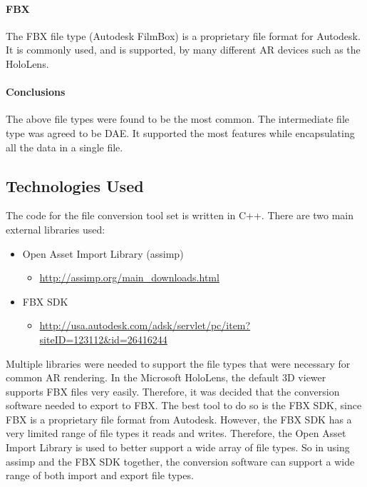     \paragraph{FBX}
    The FBX file type (Autodesk FilmBox) is a proprietary file format for Autodesk.  It is commonly used, and is supported, by many different AR devices such as the HoloLens.

    \paragraph{Conclusions}
    The above file types were found to be the most common.  The intermediate file type was agreed to be DAE.  It supported the most features while encapsulating all the data in a single file.

    \subsection{Technologies Used}
    
    The code for the file conversion tool set is written in C++.  There are two main external libraries used:
    \begin{itemize}
        \item Open Asset Import Library (assimp)
        \begin{itemize}
            \item \url{http://assimp.org/main_downloads.html}
        \end{itemize}

        \item FBX SDK
        \begin{itemize}
            \item \url{http://usa.autodesk.com/adsk/servlet/pc/item?siteID=123112&id=26416244}
        \end{itemize}
    \end{itemize}

    Multiple libraries were needed to support the file types that were necessary for common AR rendering.  In the Microsoft HoloLens, the default
    3D viewer supports FBX files very easily.  Therefore, it was decided that the conversion software needed to export to FBX.  The best tool to do 
    so is the FBX SDK, since FBX is a proprietary file format from Autodesk.  However, the FBX SDK has a very limited range of file types it reads and writes.
    Therefore, the Open Asset Import Library is used to better support a wide array of file types.  So in using assimp and the FBX SDK together,
    the conversion software can support a wide range of both import and export file types.

